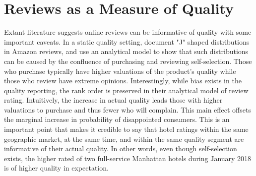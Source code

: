 \documentclass[mksc,blindrev]{informs3} %
\begin{document}
\section*{Reviews as a Measure of Quality} \label{sec:measurequality}

 

Extant literature suggests online reviews can be informative of quality with some important caveats. In a static quality setting, \citet{hu2006can} document "J" shaped distributions in Amazon reviews, and use an analytical model to show that such distributions can be caused by the confluence of purchasing and reviewing self-selection. Those who purchase typically have higher valuations of the product's quality while those who review have extreme opinions. Interestingly, while bias exists in the quality reporting, the rank order is preserved in their analytical model of review rating. Intuitively, the increase in actual quality leads those with higher valuations to purchase and thus fewer who will complain. This main effect offsets the marginal increase in probability of disappointed consumers. This is an important point that makes it credible to say that hotel ratings within the same geographic market, at the same time, and within the same quality segment are informative of their actual quality. In other words, even though self-selection exists, the higher rated of two full-service Manhattan hotels during January 2018 is of higher quality in expectation.
\end{document}
